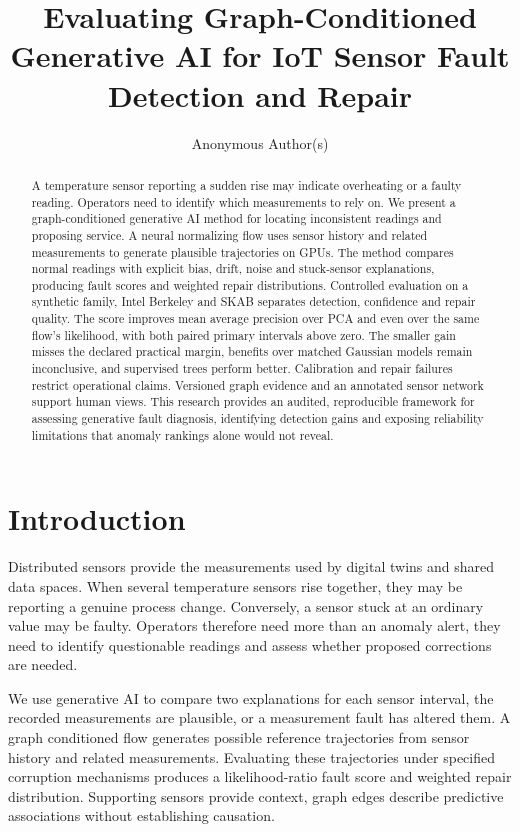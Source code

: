 \documentclass{llncs}
\title{Evaluating Graph-Conditioned Generative AI for IoT Sensor Fault Detection and Repair}
\author{Anonymous Author(s)}
\institute{Internal review artifact --- do not submit}
\newcommand{\1}{\mathbf{1}}
\begin{document}
\maketitle
\begin{abstract}
A temperature sensor reporting a sudden rise may indicate overheating or a faulty reading. Operators need to identify which measurements to rely on. We present a graph-conditioned generative AI method for locating inconsistent readings and proposing service. A neural normalizing flow uses sensor history and related measurements to generate plausible trajectories on GPUs. The method compares normal readings with explicit bias, drift, noise and stuck-sensor explanations, producing fault scores and weighted repair distributions. Controlled evaluation on a synthetic family, Intel Berkeley and SKAB separates detection, confidence and repair quality. The score improves mean average precision over PCA and even over the same flow's likelihood, with both paired primary intervals above zero. The smaller gain misses the declared practical margin, benefits over matched Gaussian models remain inconclusive, and supervised trees perform better. Calibration and repair failures restrict operational claims. Versioned graph evidence and an annotated sensor network support human views. This research provides an audited, reproducible framework for assessing generative fault diagnosis, identifying detection gains and exposing reliability limitations that anomaly rankings alone would not reveal.
\end{abstract}



\section{Introduction}
Distributed sensors provide the measurements used by digital twins and shared data spaces. When several temperature sensors rise together, they may be reporting a genuine process change. Conversely, a sensor stuck at an ordinary value may be faulty. Operators therefore need more than an anomaly alert, they need to identify questionable readings and assess whether proposed corrections are needed.

We use generative AI to compare two explanations for each sensor interval, the recorded measurements are plausible, or a measurement fault has altered them. A graph conditioned flow generates possible reference trajectories from sensor history and related measurements. Evaluating these trajectories under specified corruption mechanisms produces a likelihood-ratio fault score and weighted repair distribution. Supporting sensors provide context, graph edges describe predictive associations without establishing causation.
\end{document}
